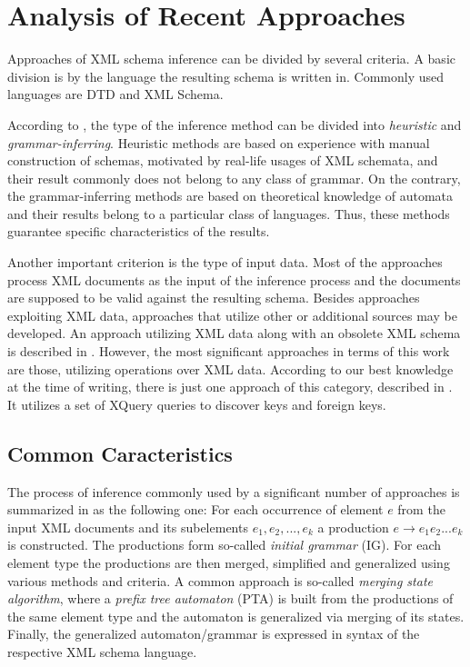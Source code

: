\chapter{Analysis of Recent Approaches}
Approaches of XML schema inference can be divided by several criteria. A basic division is by the language the resulting schema is written in. Commonly used languages are DTD and XML Schema.

According to \cite{Mlynkova:2008:AAX:1494650.1495496}, the type of the inference method can be divided into \emph{heuristic} and \emph{grammar-inferring}. Heuristic methods are based on experience with manual construction of schemas, motivated by real-life usages of XML schemata, and their result commonly does not belong to any class of grammar. On the contrary, the grammar-inferring methods are based on theoretical knowledge of automata and their results belong to a particular class of languages. Thus, these methods guarantee specific characteristics of the results. 

Another important criterion is the type of input data. Most of the approaches process XML documents as the input of the inference process and the documents are supposed to be valid against the resulting schema. Besides approaches exploiting XML data, approaches that utilize other or additional sources may be developed. An approach utilizing XML data along with an obsolete XML schema is described in \cite{Mlynkova:2009:IXS:1862681.1862693}. However, the most significant approaches in terms of this work are those, utilizing operations over XML data. According to our best knowledge at the time of writing, there is just one approach of this category, described in \cite{Necasky:2009:DXK:1529282.1529414}. It utilizes a set of XQuery queries to discover keys and foreign keys.

\section{Common Caracteristics}
The process of inference commonly used by a significant number of approaches is summarized in \cite{Mlynkova:2008:AAX:1494650.1495496} as the following one: For each occurrence of element $e$ from the input XML documents and its subelements $e_1, e_2, ..., e_k$ a production $e \rightarrow e_1 e_2 ... e_k$ is constructed. The productions form so-called \emph{initial grammar} (IG). For each element type the productions are then merged, simplified and generalized using various methods and criteria. A common approach is so-called \emph{merging state algorithm}, where a \emph{prefix tree automaton} (PTA) is built from the productions of the same element type and the automaton is generalized via merging of its states. Finally, the generalized automaton/grammar is expressed in syntax of the respective XML schema language.

